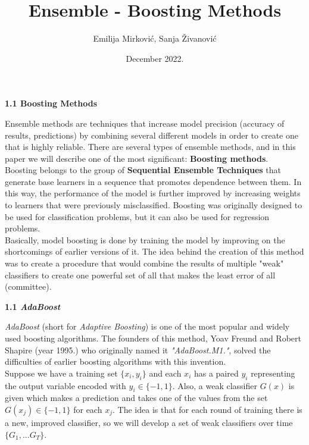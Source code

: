 \documentclass[12pt, letterpaper, twoside]{article}
\title{ %
    Ensemble - Boosting Methods
    \\ }
\author{Emilija Mirković, Sanja Živanović}
\date{December 2022.}
\begin{document}
\maketitle
\begin{center}
\textbf{\large{ 1.1 Boosting Methods}} 

\end{center}
\hspace*{4ex} Ensemble methods are techniques that increase model precision (accuracy of results, predictions) by combining several different models in order to create one that is highly reliable.
There are several types of ensemble methods, and in this paper we will describe one of the most significant: \textbf{Boosting methods}.\\
\hspace*{4ex} Boosting belongs to the group of \textbf{Sequential Ensemble Techniques} that generate base learners in a sequence that promotes dependence between them. In this way, the performance of the model is further improved by increasing weights to learners that were previously misclassified. Boosting was originally designed to be used for classification problems, but it can also be used for regression problems.\\
\hspace*{4ex}Basically, model boosting is done by training the model by improving on the shortcomings of earlier versions of it. The idea behind the creation of this method was to create a procedure that would combine the results of multiple "weak" \space classifiers to create one powerful set of all that makes the least error of all (committee).
\begin{center}
\textbf{\large{1.1 \emph{AdaBoost}}} 
\end{center}
\hspace*{4ex}\emph{AdaBoost} (short for \emph{Adaptive Boosting}) is one of the most popular and widely used boosting algorithms.
The founders of this method, Yoav Freund and Robert Shapire (year 1995.) who originally named it \emph{"AdaBoost.M1."}, solved the difficulties of earlier boosting algorithms with this invention. 
\\\hspace*{4ex} Suppose we have a training set $\{x_i,y_i\}$ and each $x_i$ has a paired $y_i$ representing the output variable encoded with $y_i \in \{-1,1\}$. Also, a weak classifier $G(x)$ is given which makes a prediction and takes one of the values from the set $G(x_j)\in\{-1,1\}$ for each $x_j$. The idea is that for each round of training there is a new, improved classifier, so we will develop a set of weak classifiers over time $\{G_1,...G_T\}$.
\end{document}
